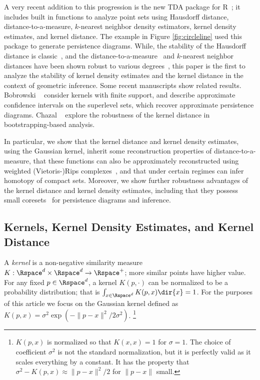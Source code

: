 \documentclass[11pt]{myclass}
\begin{document}
A very recent addition to this progression is the new TDA package for R~\cite{FKLM14}; it includes built in functions to analyze point sets using Hausdorff distance, distance-to-a-measure, $k$-nearest neighbor density estimators, kernel density estimates, and kernel distance.  The example in Figure \ref{fig:circleline} used this package to generate persistence diagrams.  
While, the stability of the Hausdorff distance is classic~\cite{CC12,Edelsbrunner1993}, and the distance-to-a-measure~\cite{ChazalCohen-SteinerMerigot2011} and $k$-nearest neighbor distances have been shown robust to various degrees~\cite{BCCSDR11}, this paper is the first to analyze the stability of kernel density estimates and the kernel distance in the context of geometric inference.
Some recent manuscripts show related results.  
Bobrowski \etal~\cite{BMT14} consider kernels with finite support, and describe approximate confidence intervals on the superlevel sets, which recover approximate persistence diagrams.  
Chazal \etal~\cite{CFLMRW14} explore the robustness of the kernel distance in bootstrapping-based analysis.

In particular, we show that the kernel distance and kernel density estimates, using the Gaussian kernel, inherit some reconstruction properties of distance-to-a-measure, that these functions can also be approximately reconstructed using weighted (Vietoris-)Rips complexes~\cite{BuchetChazalOudot2013}, and that under certain regimes can infer homotopy of compact sets.  
Moreover, we show further robustness advantages of the kernel distance and kernel density estimates, including that they possess small coresets~\cite{Phillips2013,big-kde} for persistence diagrams and inference.  

\vspace{-.1in}










\subsection{Kernels, Kernel Density Estimates, and Kernel Distance}
\label{sec:kernel}
A \emph{kernel} is a non-negative similarity measure $K : \Rspace^d \times \Rspace^d \to \Rspace^+$; more similar points have higher value.  For any fixed $p \in \Rspace^d$, a kernel $K(p,\cdot)$ can be normalized to be a probability distribution; that is $\int_{x \in \Rspace^d} K(p,x) \dir{x} = 1$.  
For the purposes of this article we focus on the Gaussian kernel defined as 
$K(p,x) =  \sigma^2 \exp(-\|p - x\|^2 / 2\sigma^2)$. \footnote{
$K(p,x)$ is normalized so that $K(x,x) = 1$ for $\sigma = 1$.  
The choice of coefficient $\sigma^2$ is not the standard normalization, but it is perfectly valid as it scales everything by a constant.  It has the property that $\sigma^2 - K(p,x) \approx \|p-x\|^2/2$ for $\|p-x\|$ small.}
\end{document}
